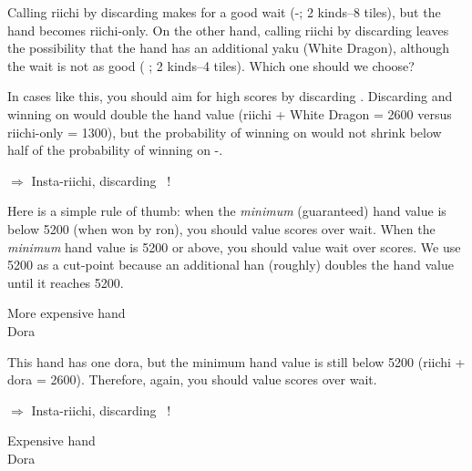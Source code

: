 \noindent Calling riichi by discarding {\LARGE{}} makes for a good wait ({\LARGE {}-}; 2 kinds--8 tiles), but the hand becomes riichi-only. On the other hand, calling riichi by discarding {\LARGE{}} leaves the possibility that the hand has an additional {\jap yaku} (White Dragon), although the wait is not as good ({\LARGE {} \bai}; 2 kinds--4 tiles). Which one should we choose?

\bigskip
In cases like this, you should aim for high scores by discarding {\LARGE{}}. 
Discarding {\LARGE{}} and winning on {\LARGE\bai} would double the hand value (riichi + White Dragon = 2600 versus riichi-only = 1300), but the probability of winning on {\LARGE\bai} would not shrink below half of the probability of winning on {\LARGE{}-}. 

\begin{center}
{\Large $\Rightarrow$ Insta-riichi, discarding  ~!}
\end{center}

\noindent Here is a simple rule of thumb: when the \emph{minimum} (guaranteed) hand value is below 5200 (when won by {\jap ron}), you should value scores over wait. When the \emph{minimum} hand value is 5200 or above, you should value wait over scores. 
We use 5200 as a cut-point because an additional {\jap han} (roughly) doubles the hand value until it reaches 5200. 

\bigskip
\begin{itembox}[r]{More expensive hand}
\bp
{}\bai\bai~~\\
\hfill\footnotesize{{\jap Dora}~~~~~~~}
\ep
\vspace{-15pt}
\end{itembox}

\noindent This hand has one {\jap dora}, but the minimum hand value is still below 5200 (riichi + {\jap dora} = 2600). Therefore, again, you should value scores over wait. 

\begin{center}
{\Large $\Rightarrow$ Insta-riichi, discarding  ~!}
\end{center}

\bigskip
\begin{itembox}[r]{Expensive hand}
\bp
{}\bai\bai\bai\fa\fa~~\\
\hfill\footnotesize{{\jap Dora}~~~~~~~}
\ep
\vspace{-15pt}
\end{itembox}

